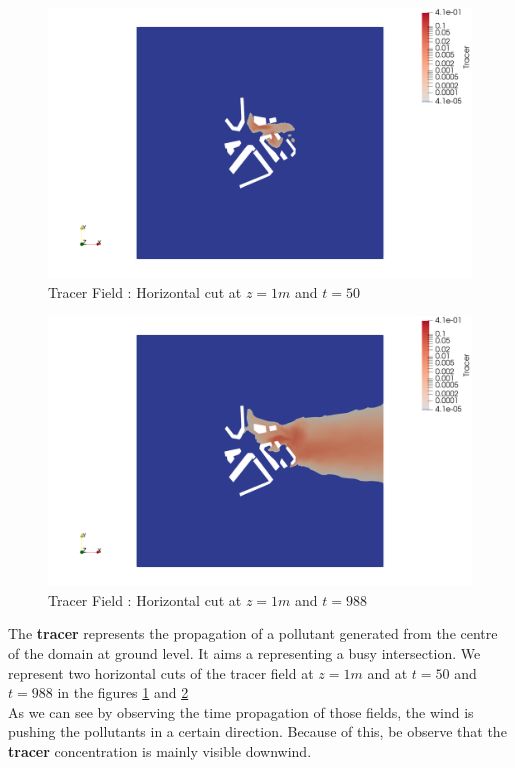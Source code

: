 \begin{figure}[h!]
\centering
  \includegraphics[width=0.8\linewidth]{figures/Analysis/tracer050cutZ1}
  \caption{Tracer Field : Horizontal cut at $z=1m$ and $t=50$  }
  \label{fig:view:tracerstart}
\end{figure}

\begin{figure}[h!]
\centering
  \includegraphics[width=0.8\linewidth]{figures/Analysis/tracer988cutZ1}
  \caption{Tracer Field : Horizontal cut at $z=1m$ and $t=988$}
  \label{fig:view:tracerend}
\end{figure}




The \textbf{tracer} represents the propagation of a pollutant generated from the centre of the domain at ground level. It aims a representing a busy intersection. We represent two horizontal cuts of the tracer field at $z=1m$ and at $t=50$ and $t=988$ in the figures \ref{fig:view:tracerstart} and \ref{fig:view:tracerend}\\




As we can see by observing the time propagation of those fields,  the wind is pushing the pollutants in a certain direction. Because of this, be observe that the \textbf{tracer} concentration is mainly visible downwind. \\


